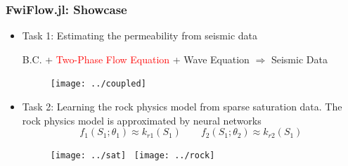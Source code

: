 \documentclass{beamer}
\begin{document}
\begin{frame}
	\frametitle{FwiFlow.jl: Showcase}
	\begin{itemize}
		\item Task 1: Estimating the permeability from seismic data 
		\begin{center}
	B.C. +	\textcolor{red}{Two-Phase Flow Equation} + Wave Equation $\Rightarrow$ Seismic Data
	\end{center}
		\begin{figure}[hbt]
		\centering
  \texttt{[image: ../coupled]}
\end{figure}
\item Task 2: Learning the rock physics model from sparse saturation data. The rock physics model is approximated by neural networks  
{\scriptsize$$f_1(S_1; \theta_1) \approx k_{r1}(S_1)\qquad f_2(S_1; \theta_2) \approx k_{r2}(S_1)$$}
\vspace{-0.4cm}
\begin{figure}
	\centering
	\texttt{[image: ../sat]}~
  \texttt{[image: ../rock]}
\end{figure}
	\end{itemize}
\end{frame}
\end{document}
